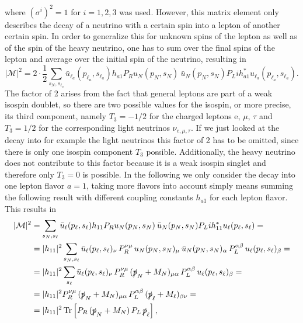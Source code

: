 where $\left(\sigma^i\right)^2=1$ for $i=1,2,3$ was used. \newline\indent
However, this matrix element only describes the decay of a neutrino with a certain spin into a lepton of another certain spin. In order to generalize this for unknown spins of the lepton as well as of the spin of the heavy neutrino, one has to sum over the final spins of the lepton and average over the initial spin of the neutrino, resulting in
\begin{equation*}
|\mathcal{M}|^2=2\cdot\frac{1}{2}\sum_{s_N,s_{\ell_a}}\bar{u}_{\ell_a}(p_{\ell_a},s_{\ell_a})h_{a1}P_Ru_N(p_N,s_N)\:\bar{u}_{N}(p_{N},s_{N})P_Lih^*_{a1}u_{\ell_a}(p_{\ell_a},s_{\ell_a}).
\end{equation*}
The factor of 2 arises from the fact that general leptons are part of a weak isospin doublet, so there are two possible values for the isospin, or more precise, its third component, namely $T_3=-1/2$ for the charged leptons e, $\mu$, $\tau$ and $T_3=1/2$ for the corresponding light neutrinos $\nu_{e,\mu,\tau}$. If we just looked at the decay into for example the light neutrinos this factor of 2 has to be omitted, since there is only one isospin component $T_3$ possible. Additionally, the heavy neutrino does not contribute to this factor because it is a weak isospin singlet and therefore only $T_3=0$ is possible. \newline\indent
In the following we only consider the decay into one lepton flavor $a=1$, taking more flavors into account simply means summing the following result with different coupling constants $h_{a1}$ for each lepton flavor. This results in
\begin{align*}
|\mathcal{M}|^2&=\sum_{s_N,s_{\ell}}\bar{u}_{\ell}(p_{\ell},s_{\ell})h_{11}P_Ru_N(p_N,s_N)\:\bar{u}_{N}(p_{N},s_{N})P_Lih^*_{11}u_{\ell}(p_{\ell},s_{\ell})=\\
&=|h_{11}|^2\sum_{s_N,s_{\ell}}\bar{u}_{\ell}(p_{\ell},s_{\ell})_\nu\, P_R^{\nu\mu}\,u_N(p_N,s_N)_\mu\:\bar{u}_{N}(p_{N},s_{N})_\alpha\, P_L^{\alpha\beta}\,u_{\ell}(p_{\ell},s_{\ell})_\beta=\\
&=|h_{11}|^2\sum_{s_{\ell}}\bar{u}_{\ell}(p_{\ell},s_{\ell})_\nu\, P_R^{\nu\mu}\,(\slashed p_N+M_N)_{\mu\alpha}\, P_L^{\alpha\beta}\,u_{\ell}(p_{\ell},s_{\ell})_\beta=\\
&=|h_{11}|^2P_R^{\nu\mu}\,(\slashed p_N+M_N)_{\mu\alpha}\, P_L^{\alpha\beta}\,(\slashed p_\ell+M_\ell)_{\beta\nu}=\\
&=|h_{11}|^2\,\text{Tr}\left[P_R\,(\slashed p_N+M_N)\, P_L\,\slashed p_\ell\right],
\end{align*}
